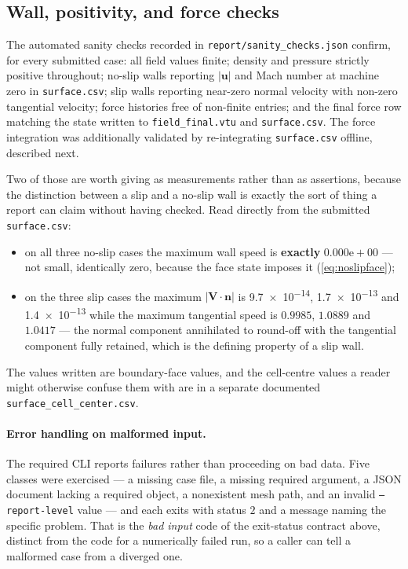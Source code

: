 \subsection{Wall, positivity, and force checks}

The automated sanity checks recorded in \texttt{report/sanity\_checks.json}
confirm, for every submitted case: all field values finite; density and pressure
strictly positive throughout; no-slip walls reporting $|\mathbf{u}|$ and Mach
number at machine zero in \texttt{surface.csv}; slip walls reporting near-zero
normal velocity with non-zero tangential velocity; force histories free of
non-finite entries; and the final force row matching the state written to
\texttt{field\_final.vtu} and \texttt{surface.csv}. The force integration was
additionally validated by re-integrating \texttt{surface.csv} offline, described
next.

Two of those are worth giving as measurements rather than as assertions, because the
distinction between a slip and a no-slip wall is exactly the sort of thing a report can
claim without having checked. Read directly from the submitted \texttt{surface.csv}:
\begin{itemize}
  \item on all three no-slip cases the maximum wall speed is \textbf{exactly}
  $0.000\mathrm{e}{+}00$ --- not small, identically zero, because the face state imposes it
  (\cref{eq:noslipface});
  \item on the three slip cases the maximum $|\mathbf{V}\!\cdot\!\mathbf{n}|$ is
  \num{9.7e-14}, \num{1.7e-13} and \num{1.4e-13} while the maximum tangential speed is
  $0.9985$, $1.0889$ and $1.0417$ --- the normal component annihilated to round-off with the
  tangential component fully retained, which is the defining property of a slip wall.
\end{itemize}
The values written are boundary-face values, and the cell-centre values a reader might
otherwise confuse them with are in a separate documented \texttt{surface\_cell\_center.csv}.

\paragraph{Error handling on malformed input.} The required CLI reports failures rather than
proceeding on bad data. Five classes were exercised --- a missing case file, a missing
required argument, a JSON document lacking a required object, a nonexistent mesh path, and an
invalid \texttt{--report-level} value --- and each exits with status $2$ and a message naming
the specific problem. That is the \emph{bad input} code of the exit-status contract above,
distinct from the code for a numerically failed run, so a caller can tell a malformed case
from a diverged one.

